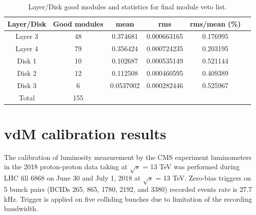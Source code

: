\begin{table}[!htp]
  \centering
  \caption[Final module veto statistics]{Layer/Disk good modules and statistics for final module veto list.}
\begin{tabular}{cccccc}
\textbf{Layer/Disk} & \textbf{Good modules} & \textbf{mean} & \textbf{rms} & \textbf{rms/mean} (\%) \\
\hline
Layer 3 & 48 & 0.374681 & 0.000663165 & 0.176995 \\
Layer 4 & 79 & 0.356424 & 0.000724235 & 0.203195 \\
Disk 1 & 10 & 0.102687 & 0.000535149 & 0.521144 \\
Disk 2 & 12 & 0.112508 & 0.000460595 & 0.409389 \\
Disk 3 & 6 & 0.0537002 & 0.000282446 & 0.525967 \\
Total  & 155 & & \\
\end{tabular}
\label{tab:layer-disk}
\end{table}

\section{vdM calibration results}

The calibration of luminosity measurement by the CMS experiment luminometers in the 2018 proton-proton data taking at $\sqrt{s}$ = 13 TeV \cite{pas_18} was performed during LHC fill 6868 on June 30 and July 1, 2018 at $\sqrt{s}$ = 13 TeV. Zero-bias triggers on 5 bunch pairs (BCIDs 265, 865, 1780, 2192, and 3380) recorded events rate is 27.7 kHz. Trigger is applied on five colliding bunches due to limitation of the recording bandwidth.

